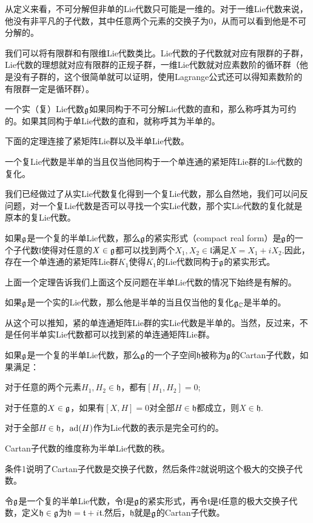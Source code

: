 从定义来看，不可分解但非单的Lie代数只可能是一维的。对于一维Lie代数来说，他没有非平凡的子代数，其中任意两个元素的交换子为0，从而可以看到他是不可分解的。

我们可以将有限群和有限维Lie代数类比。Lie代数的子代数就对应有限群的子群，Lie代数的理想就对应有限群的正规子群，一维Lie代数就对应素数阶的循环群（他是没有子群的，这个很简单就可以证明，使用Lagrange公式还可以得知素数阶的有限群一定是循环群）。

\para 一个实（复）Lie代数${\mathfrak{g}}$如果同构于不可分解Lie代数的直和，那么称呼其为可约的。如果其同构于单Lie代数的直和，就称呼其为半单的。

下面的定理连接了紧矩阵Lie群以及半单Lie代数。

\theo 一个复Lie代数是半单的当且仅当他同构于一个单连通的紧矩阵Lie群的Lie代数的复化。

我们已经做过了从实Lie代数复化得到一个复Lie代数，那么自然地，我们可以问反问题，对一个复Lie代数是否可以寻找一个实Lie代数，那个实Lie代数的复化就是原本的复Lie代数。

\para 如果${\mathfrak{g}}$是一个复的半单Lie代数，那么${\mathfrak{g}}$的紧实形式（compact real form）是${\mathfrak{g}}$的一个子代数$\mathfrak{l}$使得对任意的$X\in{\mathfrak{g}}$都可以找到两个$X_1,X_2\in\mathfrak{l}$满足$X=X_1+iX_2$.因此，存在一个单连通的紧矩阵Lie群$K_1$使得$K_1$的Lie代数同构于${\mathfrak{g}}$的紧实形式。

上面一个定理告诉我们上面这个反问题在半单Lie代数的情况下始终是有解的。

\pro 如果${\mathfrak{g}}$是一个实的Lie代数，那么他是半单的当且仅当他的复化${\mathfrak{g}}_{\mathbb{C}}$是半单的。

从这个可以推知，紧的单连通矩阵Lie群的实Lie代数是半单的。当然，反过来，不是任何半单实Lie代数都可以找到紧的单连通矩阵Lie群。

\para 如果${\mathfrak{g}}$是一个复的半单Lie代数，那么${\mathfrak{g}}$的一个子空间$\mathfrak{h}$被称为${\mathfrak{g}}$的Cartan子代数，如果满足：

 对于任意的两个元素$H_1,H_2\in\mathfrak{h}$，都有$[H_1,H_2]=0$;

 对于任意的$X\in {\mathfrak{g}}$，如果有$[X,H]=0$对全部$H\in\mathfrak{h}$都成立，则$X\in \mathfrak{h}$.

 对于全部$H\in \mathfrak{h}$，$\operatorname{ad}(H)$作为Lie代数的表示是完全可约的。

Cartan子代数的维度称为半单Lie代数的秩。

条件1说明了Cartan子代数是交换子代数，然后条件2就说明这个极大的交换子代数。

\pro 令${\mathfrak{g}}$是一个复的半单Lie代数，令$\mathfrak{l}$是${\mathfrak{g}}$的紧实形式，再令$\mathfrak{t}$是$\mathfrak{l}$任意的极大交换子代数，定义$\mathfrak{h}\in{\mathfrak{g}}$为$\mathfrak{h}=\mathfrak{t}+i\mathfrak{t}$.然后，$\mathfrak{h}$就是${\mathfrak{g}}$的Cartan子代数。

